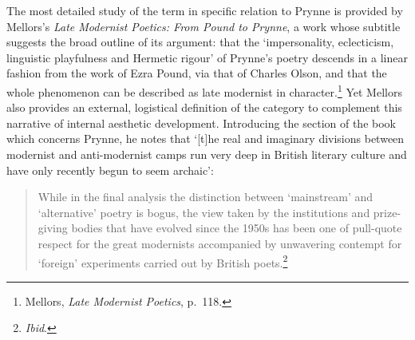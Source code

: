 \documentclass[]{article}
\begin{document}
The most detailed study of the term in specific relation to Prynne is
provided by Mellors's \emph{Late Modernist Poetics: From Pound to
Prynne}, a work whose subtitle suggests the broad outline of its
argument: that the `impersonality, eclecticism, linguistic playfulness
and Hermetic rigour' of Prynne's poetry descends in a linear fashion
from the work of Ezra Pound, via that of Charles Olson, and that the
whole phenomenon can be described as late modernist in
character.\footnote{Mellors, \emph{Late Modernist Poetics}, p.~118.} Yet
Mellors also provides an external, logistical definition of the category
to complement this narrative of internal aesthetic development.
Introducing the section of the book which concerns Prynne, he notes that
`{[}t{]}he real and imaginary divisions between modernist and
anti-modernist camps run very deep in British literary culture and have
only recently begun to seem archaic':

\begin{quote}
While in the final analysis the distinction between `mainstream' and
`alternative' poetry is bogus, the view taken by the institutions and
prize-giving bodies that have evolved since the 1950s has been one of
pull-quote respect for the great modernists accompanied by unwavering
contempt for `foreign' experiments carried out by British
poets.\footnote{\emph{Ibid}.}
\end{quote}
\end{document}
